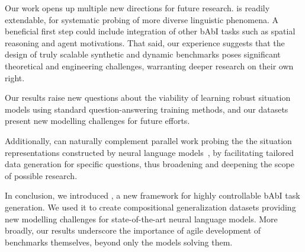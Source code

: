 Our work opens up multiple new directions for future research. \pybabi is readily extendable, for systematic probing of more diverse linguistic phenomena. A beneficial first step could include integration of other bAbI tasks such as spatial reasoning and agent motivations. That said, our experience suggests that the design of truly scalable synthetic and dynamic benchmarks poses significant theoretical and engineering challenges, warranting deeper research on their own right.

Our results raise new questions about the viability of learning robust situation models using standard question-answering training methods, and our datasets present new modelling challenges for future efforts. 

Additionally, \pybabi can naturally complement parallel work probing the the situation representations constructed by neural language models~\citep{li-etal-2021-implicit}, by facilitating tailored data generation for specific questions, thus broadening and deepening the scope of possible research.

In conclusion, we introduced \pybabi, a new framework for highly controllable bAbI task generation. We used it to create compositional generalization datasets providing new modelling challenges for state-of-the-art neural language models. More broadly, our results underscore the importance of agile development of benchmarks themselves, beyond only the models solving them.

